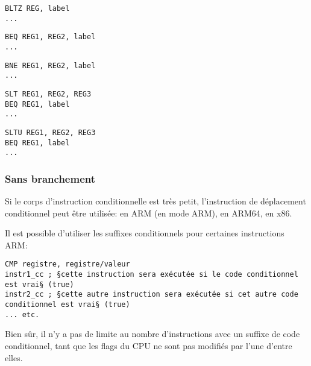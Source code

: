 \begin{lstlisting}[caption=Check si plus petit que zéro (Branch if Less Than Zero) en utilisant une pseudo instruction,style=customasmMIPS]
BLTZ REG, label
...
\end{lstlisting}

\begin{lstlisting}[caption=Check si les valeurs sont égales (Branch if EQual),style=customasmMIPS]
BEQ REG1, REG2, label
...
\end{lstlisting}

\begin{lstlisting}[caption=Check si les valeurs ne sont pas égales (Branch if Not Equal),style=customasmMIPS]
BNE REG1, REG2, label
...
\end{lstlisting}

\begin{lstlisting}[caption=Check REG2 plus petit que REG3 (signé),style=customasmMIPS]
SLT REG1, REG2, REG3
BEQ REG1, label
...
\end{lstlisting}

\begin{lstlisting}[caption=Check REG2 plus petit que REG3 (non signé),style=customasmMIPS]
SLTU REG1, REG2, REG3
BEQ REG1, label
...
\end{lstlisting}

\subsubsection{Sans branchement}

Si le corps d'instruction conditionnelle est très petit, l'instruction de déplacement
conditionnel peut être utilisée:
 en ARM (en mode ARM),  en ARM64,  en x86.


Il est possible d'utiliser les suffixes conditionnels pour certaines instructions
ARM:

\begin{lstlisting}[caption=ARM (\ARMMode),style=customasmARM]
CMP registre, registre/valeur
instr1_cc ; §cette instruction sera exécutée si le code conditionnel est vrai§ (true)
instr2_cc ; §cette autre instruction sera exécutée si cet autre code conditionnel est vrai§ (true)
... etc.
\end{lstlisting}

Bien sûr, il n'y a pas de limite au nombre d'instructions avec un suffixe de code
conditionnel, tant que les flags du CPU ne sont pas modifiés par l'une d'entre elles.

